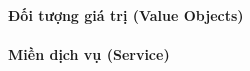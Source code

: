 \documentclass{article} %
\begin{document}
% 

\paragraph{Đối tượng giá trị (Value Objects)}

% 

\paragraph{Miền dịch vụ (Service)}

% 




% 
\end{document}
